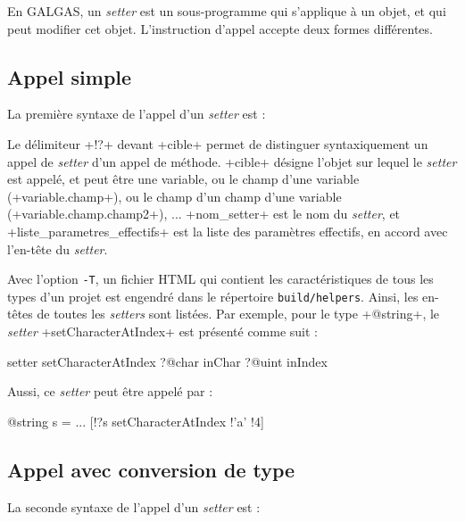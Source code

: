 En GALGAS, un \emph{setter} est un sous-programme qui s'applique à un objet, et qui peut modifier cet objet. L'instruction d'appel accepte deux formes différentes.

\subsection{Appel simple}

La première syntaxe de l'appel d'un  \emph{setter} est :
\begin{galgas}
\end{galgas}

Le délimiteur \ggs+!?+  devant \ggs+cible+ permet de distinguer syntaxiquement un appel de \emph{setter} d'un appel de méthode. \ggs+cible+ désigne l'objet sur lequel le \emph{setter} est appelé, et peut être une variable, ou le champ d'une variable (\ggs+variable.champ+), ou le champ d'un champ d'une variable (\ggs+variable.champ.champ2+), ... \ggs+nom_setter+ est le nom du \emph{setter}, et \ggs+liste_parametres_effectifs+ est la liste des paramètres effectifs, en accord avec l'en-tête du \emph{setter}.

Avec l'option \texttt{-T}, un fichier HTML qui contient les caractéristiques de tous les types d'un projet est engendré dans le répertoire \texttt{build/helpers}. Ainsi, les en-têtes de toutes les \emph{setters} sont listées. Par exemple, pour le type \ggs+@string+, le \emph{setter} \ggs+setCharacterAtIndex+ est présenté comme suit :

\begin{galgas}
setter setCharacterAtIndex
  ?@char inChar
  ?@uint inIndex
\end{galgas}

Aussi, ce \emph{setter} peut être appelé par :
\begin{galgas}
@string s = ...
[!?s setCharacterAtIndex !'a' !4]
\end{galgas}


\subsection{Appel avec conversion de type}

La seconde syntaxe de l'appel d'un  \emph{setter} est :

\begin{galgas}
\end{galgas}

